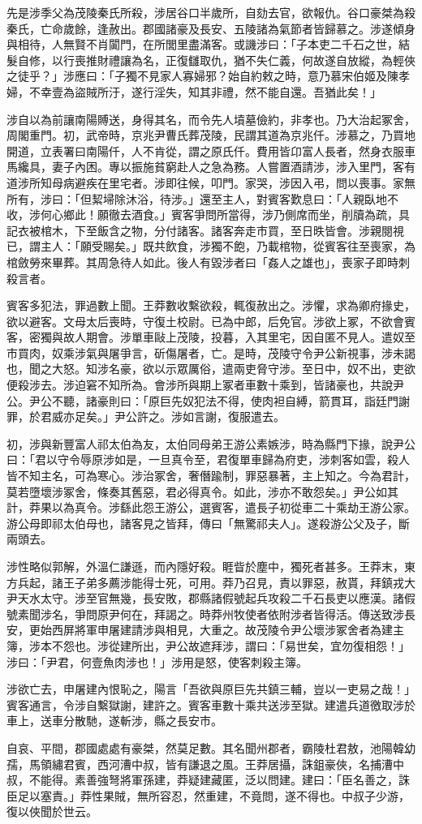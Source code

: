 \begin{pinyinscope}
先是涉季父為茂陵秦氏所殺，涉居谷口半歲所，自劾去官，欲報仇。谷口豪桀為殺秦氏，亡命歲餘，逢赦出。郡國諸豪及長安、五陵諸為氣節者皆歸慕之。涉遂傾身與相待，人無賢不肖闐門，在所閭里盡滿客。或譏涉曰：「子本吏二千石之世，結髮自修，以行喪推財禮讓為名，正復讎取仇，猶不失仁義，何故遂自放縱，為輕俠之徒乎？」涉應曰：「子獨不見家人寡婦邪？始自約敕之時，意乃慕宋伯姬及陳孝婦，不幸壹為盜賊所汙，遂行淫失，知其非禮，然不能自還。吾猶此矣！」

涉自以為前讓南陽賻送，身得其名，而令先人墳墓儉約，非孝也。乃大治起冢舍，周閣重門。初，武帝時，京兆尹曹氏葬茂陵，民謂其道為京兆仟。涉慕之，乃買地開道，立表署曰南陽仟，人不肯從，謂之原氏仟。費用皆卬富人長者，然身衣服車馬纔具，妻子內困。專以振施貧窮赴人之急為務。人嘗置酒請涉，涉入里門，客有道涉所知母病避疾在里宅者。涉即往候，叩門。家哭，涉因入弔，問以喪事。家無所有，涉曰：「但絜埽除沐浴，待涉。」還至主人，對賓客歎息曰：「人親臥地不收，涉何心鄉此！願徹去酒食。」賓客爭問所當得，涉乃側席而坐，削牘為疏，具記衣被棺木，下至飯含之物，分付諸客。諸客奔走市買，至日昳皆會。涉親閱視已，謂主人：「願受賜矣。」既共飲食，涉獨不飽，乃載棺物，從賓客往至喪家，為棺斂勞來畢葬。其周急待人如此。後人有毀涉者曰「姦人之雄也」，喪家子即時刺殺言者。

賓客多犯法，罪過數上聞。王莽數收繫欲殺，輒復赦出之。涉懼，求為卿府掾史，欲以避客。文母太后喪時，守復土校尉。已為中郎，后免官。涉欲上冢，不欲會賓客，密獨與故人期會。涉單車敺上茂陵，投暮，入其里宅，因自匿不見人。遣奴至市買肉，奴乘涉氣與屠爭言，斫傷屠者，亡。是時，茂陵守令尹公新視事，涉未謁也，聞之大怒。知涉名豪，欲以示眾厲俗，遣兩吏脅守涉。至日中，奴不出，吏欲便殺涉去。涉迫窘不知所為。會涉所與期上冢者車數十乘到，皆諸豪也，共說尹公。尹公不聽，諸豪則曰：「原巨先奴犯法不得，使肉袒自縛，箭貫耳，詣廷門謝罪，於君威亦足矣。」尹公許之。涉如言謝，復服遣去。

初，涉與新豐富人祁太伯為友，太伯同母弟王游公素嫉涉，時為縣門下掾，說尹公曰：「君以守令辱原涉如是，一旦真令至，君復單車歸為府吏，涉刺客如雲，殺人皆不知主名，可為寒心。涉治冢舍，奢僭踰制，罪惡暴著，主上知之。今為君計，莫若墮壞涉冢舍，條奏其舊惡，君必得真令。如此，涉亦不敢怨矣。」尹公如其計，莽果以為真令。涉繇此怨王游公，選賓客，遣長子初從車二十乘劫王游公家。游公母即祁太伯母也，諸客見之皆拜，傳曰「無驚祁夫人」。遂殺游公父及子，斷兩頭去。

涉性略似郭解，外溫仁謙遜，而內隱好殺。睚眥於塵中，獨死者甚多。王莽末，東方兵起，諸王子弟多薦涉能得士死，可用。莽乃召見，責以罪惡，赦貰，拜鎮戎大尹天水太守。涉至官無幾，長安敗，郡縣諸假號起兵攻殺二千石長吏以應漢。諸假號素聞涉名，爭問原尹何在，拜謁之。時莽州牧使者依附涉者皆得活。傳送致涉長安，更始西屏將軍申屠建請涉與相見，大重之。故茂陵令尹公壞涉冢舍者為建主簿，涉本不怨也。涉從建所出，尹公故遮拜涉，謂曰：「易世矣，宜勿復相怨！」涉曰：「尹君，何壹魚肉涉也！」涉用是怒，使客刺殺主簿。

涉欲亡去，申屠建內恨恥之，陽言「吾欲與原巨先共鎮三輔，豈以一吏易之哉！」賓客通言，令涉自繫獄謝，建許之。賓客車數十乘共送涉至獄。建遣兵道徼取涉於車上，送車分散馳，遂斬涉，縣之長安市。

自哀、平間，郡國處處有豪桀，然莫足數。其名聞州郡者，霸陵杜君敖，池陽韓幼孺，馬領繡君賓，西河漕中叔，皆有謙退之風。王莽居攝，誅鉏豪俠，名捕漕中叔，不能得。素善強弩將軍孫建，莽疑建藏匿，泛以問建。建曰：「臣名善之，誅臣足以塞責。」莽性果賊，無所容忍，然重建，不竟問，遂不得也。中叔子少游，復以俠聞於世云。


\end{pinyinscope}